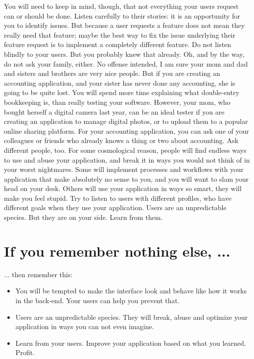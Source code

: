You will need to keep in mind, though, that not everything your users request
can or should be done. Listen carefully to their stories: it is an opportunity
for you to identify issues. But because a user requests a feature does not mean
they really need that feature; maybe the best way to fix the issue underlying
their feature request is to implement a completely different feature. Do not
listen blindly to your users. But you probably knew that already. 
\newline
Oh, and by the way, do not ask your family, either.
\newline
No offense intended, I am sure your mom and dad and sisters and brothers are very nice people. But if you are creating an accounting application, and your sister has never done any accounting, she is going to be quite lost. You will spend more time explaining what double-entry bookkeeping is, than really testing your software. However, your mom, who bought herself a digital camera last year, can be an ideal tester if you are creating an application to manage digital photos, or to upload them to a popular online sharing platform. For your accounting application, you can ask one of your colleagues or friends who already knows a thing or two about accounting.
\newline
Ask different people, too.
\newline
For some cosmological reason, people will find endless ways to use and abuse
your application, and break it in ways you would not think of in your worst
nightmares. Some will implement processes and workflows with your application
that make absolutely no sense to you, and you will want to slam your head on
your desk. Others will use your application in ways so smart, they will make you
feel stupid. Try to listen to users with different profiles, who have different
goals when they use your application.
\newline
Users are an unpredictable species. But they are on your side. Learn from them.

\section*{If you remember nothing else, ...}
... then remember this:
\begin{itemize}
 \item You will be tempted to make the interface look and behave like how it
works in the back-end. Your users can help you prevent that.
 \item Users are an unpredictable species. They will break, abuse and optimize
your application in ways you can not even imagine.
 \item Learn from your users. Improve your application based on what you
learned. Profit.
\end{itemize}
